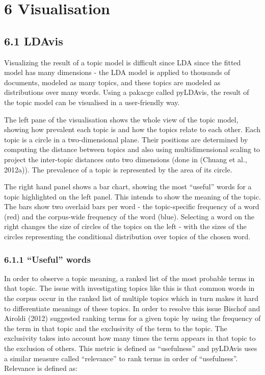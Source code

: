 \documentclass[
]{article}
\begin{document}
\hypertarget{visualisation}{%
\section{6 Visualisation}\label{visualisation}}

\hypertarget{ldavis}{%
\subsection{6.1 LDAvis}\label{ldavis}}

Visualizing the result of a topic model is difficult since LDA since the
fitted model has many dimensions - the LDA model is applied to thousands
of documents, modeled as many topics, and these topics are modeled as
distributions over many words. Using a pakacge called pyLDAvis, the
result of the topic model can be visualised in a user-friendly way.

The left pane of the visualisation shows the whole view of the topic
model, showing how prevalent each topic is and how the topics relate to
each other. Each topic is a circle in a two-dimensional plane. Their
positions are determined by computing the distance between topics and
also using multidimensional scaling to project the inter-topic distances
onto two dimensions (done in (Chuang et al., 2012a)). The prevalence of
a topic is represented by the area of its circle.

The right hand panel shows a bar chart, showing the most ``useful''
words for a topic highlighted on the left panel. This intends to show
the meaning of the topic. The bars show two overlaid bars per word - the
topic-specific frequency of a word (red) and the corpus-wide frequency
of the word (blue). Selecting a word on the right changes the size of
circles of the topics on the left - with the sizes of the circles
representing the conditional distribution over topics of the chosen
word.

\hypertarget{useful-words}{%
\subsubsection{6.1.1 ``Useful'' words}\label{useful-words}}

In order to observe a topic meaning, a ranked list of the most probable
terms in that topic. The issue with investigating topics like this is
that common words in the corpus occur in the ranked list of multiple
topics which in turn makes it hard to differentiate meanings of these
topics. In order to resolve this issue Bischof and Airoldi (2012)
suggested ranking terms for a given topic by using the frequency of the
term in that topic and the exclusivity of the term to the topic. The
exclusivity takes into account how many times the term appears in that
topic to the exclusion of others. This metric is defined as
``usefulness'' and pyLDAvis uses a similar measure called ``relevance''
to rank terms in order of ``usefulness''. Relevance is defined as:
\end{document}
